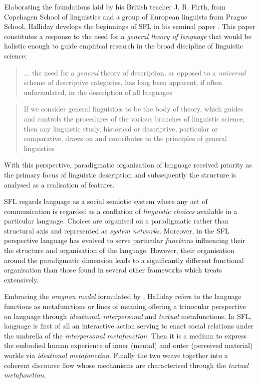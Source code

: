 Elaborating the foundations laid by his British teacher J. R. Firth, \citet{Hjelmslev53} from Copehagen School of linguistics and a group of European linguists from Prague School, Halliday develops the beginnings of SFL in his seminal paper \cite{Halliday61-orig}. This paper constitutes a response to the need for a \textit{general theory of language} that would be holistic enough to guide empirical research in the broad discipline of linguistic science:
\begin{quotation}
    ... the need for a \textit{general} theory of description, as opposed to a \textit{universal} scheme of descriptive categories, has long been apparent, if often unformulated, in the description of all languages \citep[p.54; emphasis in original]{Halliday57}
\end{quotation} 
\begin{quotation}
    If we consider general linguistics to be the body of theory, which guides and controls the procedures of the various branches of linguistic science, then any linguistic study, historical or descriptive, particular or comparative, draws on and contributes to the principles of general linguistics \citep[p.55]{Halliday57}
\end{quotation} 

With this perspective, paradigmatic organization of language received priority as the primary focus of linguistic description and subsequently the structure is analysed as a realisation of features. 


SFL regards language as a social semiotic system where any act of communication is regarded as a conflation of \textit{linguistic choices} available in a particular language. Choices are organised on a paradigmatic rather than structural axis and represented as \textit{system networks}. Moreover, in the SFL perspective language has evolved to serve particular \textit{functions} influencing their the structure and organisation of the language. However, their organisation around the paradigmatic dimension leads to a significantly different functional organisation than those found in several other frameworks which \citet{Butler2003-pt1, Butler2003-pt2} treats extensively. 

Embracing the \textit{oragnon model} formulated by \citet{Buhler34}, Halliday refers to the language functions as metafunctions or lines of meaning offering a trinocular perspective on language through \textit{ideational}, \textit{interpersonal} and \textit{textual} metafunctions. In SFL, language is first of all an interactive action serving to enact social relations under the umbrella of the \textit{interpersonal metafunction}. Then it is a medium to express the embodied human experience of inner (mental) and outer (perceived material) worlds via \textit{ideational metafunction}. Finally the two weave together into a coherent discourse flow whose mechanisms are characterised through the \textit{textual metafunction}.

